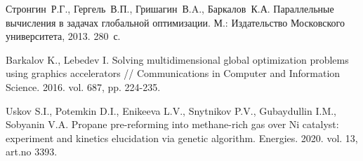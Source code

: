 \documentclass[11pt, oneside, a4paper]{article}
\begin{document}
\begin{biblio}


Стронгин~Р.Г., Гергель~В.П., Гришагин~В.A., Баркалов~К.А. Параллельные вычисления в задачах глобальной оптимизации. М.: Издательство Московского университета, 2013. 280~с.

 Barkalov K., Lebedev I. Solving multidimensional global optimization problems using graphics accelerators // Communications in Computer and Information Science. 2016. vol. 687, pp. 224-235. 

 Uskov S.I., Potemkin D.I., Enikeeva L.V., Snytnikov P.V., Gubaydullin I.M., Sobyanin V.A. Propane pre-reforming into methane-rich gas over Ni catalyst: experiment and kinetics elucidation via genetic algorithm. Energies. 2020. vol. 13, art.no 3393.


\end{biblio}
\end{document}
